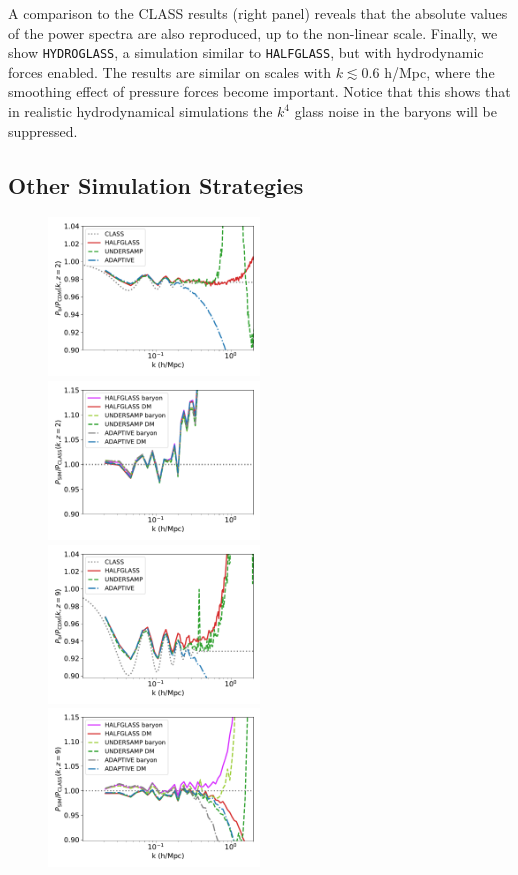\documentclass[a4paper,11pt]{article}
\begin{document}
A comparison to the CLASS results (right panel) reveals that the absolute values of the power spectra are also reproduced, up to the non-linear scale. Finally, we show \texttt{HYDROGLASS}, a simulation similar to \texttt{HALFGLASS}, but with hydrodynamic forces enabled. The results are similar on scales with $k \lesssim 0.6$ h/Mpc, where the smoothing effect of pressure forces become important. Notice that this shows that in realistic hydrodynamical simulations the $k^4$ glass noise in the baryons will be suppressed.

\subsection{Other Simulation Strategies}
\label{sec:otherstrat}

\begin{figure}
\includegraphics[width=0.5\textwidth]{plots/oversample_2_relpower.pdf}
  \includegraphics[width=0.5\textwidth]{plots/oversample_2_class.pdf} \\
  \includegraphics[width=0.5\textwidth]{plots/oversample_9_relpower.pdf}
  \includegraphics[width=0.5\textwidth]{plots/oversample_9_class.pdf}


\end{figure}
\end{document}
